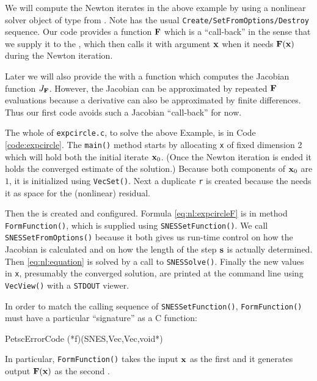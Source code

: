 We will compute the Newton iterates in the above example by using a nonlinear solver object of type \pSNES{} from \PETSc.  Note \pSNES has the usual \texttt{Create/SetFromOptions/Destroy} sequence.  Our code provides a function $\mathbf{F}$ which is a ``call-back'' in the sense that we supply it to the \pSNES, which then calls it with argument $\mathbf{x}$ when it needs $\mathbf{F}(\mathbf{x})$ during the Newton iteration.

Later we will also provide the \pSNES with a function which computes the Jacobian function $J_{\mathbf{F}}$.  However, the Jacobian can be approximated by repeated $\mathbf{F}$ evaluations because a derivative can also be approximated by finite differences.  Thus our first code avoids such a Jacobian ``call-back'' for now.

The whole of \texttt{expcircle.c}, to solve the above Example, is in Code \ref{code:expcircle}.  The \texttt{main()} method starts by allocating \pVec \texttt{x} of fixed dimension 2 which will hold both the initial iterate $\mathbf{x}_0$.  (Once the Newton iteration is ended it holds the converged estimate of the solution.)  Because both components of $\mathbf{x}_0$ are $1$, it is initialized using \texttt{VecSet()}.  Next a duplicate \pVec \texttt{r} is created because the \pSNES needs it as space for the (nonlinear) residual.

Then the \pSNES is created and configured.  Formula \eqref{eq:nl:expcircleF} is in method \texttt{FormFunction()}, which is supplied using \texttt{SNESSetFunction()}.  We call \texttt{SNESSetFromOptions()} because it both gives us run-time control on how the Jacobian is calculated and on how the length of the step $\mathbf{s}$ is actually determined.  Then \eqref{eq:nl:equation} is solved by a call to \texttt{SNESSolve()}.  Finally the new values in \texttt{x}, presumably the converged solution, are printed at the command line using \texttt{VecView()} with a \texttt{STDOUT} viewer.

\vfill
{}

In order to match the calling sequence of \texttt{SNESSetFunction()}, \texttt{FormFunction()} must have a particular ``signature'' as a C function:
\begin{code}
PetscErrorCode (*f)(SNES,Vec,Vec,void*)
\end{code}
In particular, \texttt{FormFunction()} takes the input $\mathbf{x}$ as the first \pVec and it generates output $\mathbf{F}(\mathbf{x})$ as the second \pVec.

